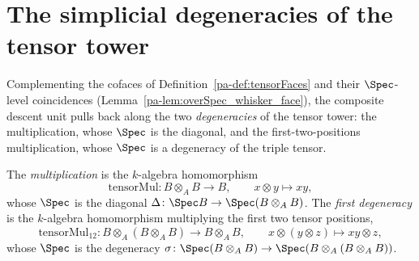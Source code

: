 \section{The simplicial degeneracies of the tensor tower}
\label{pa-sec:specDegeneracy}

Complementing the cofaces of Definition~\ref{pa-def:tensorFaces} and their \(\Spec\)-level
coincidences (Lemma~\ref{pa-lem:overSpec_whisker_face}), the composite descent unit pulls back
along the two \emph{degeneracies} of the tensor tower: the multiplication, whose \(\Spec\)
is the diagonal, and the first-two-positions multiplication, whose \(\Spec\) is a
degeneracy of the triple tensor.

\begin{definition}
  \label{pa-def:tensorMul}
  \leanok

  The \emph{multiplication} is the \(k\)-algebra homomorphism
  \[
    \mathrm{tensorMul} \colon B \otimes_A B \to B, \qquad x \otimes y \mapsto xy ,
  \]
  whose \(\Spec\) is the diagonal \(\Delta \colon \Spec B \to \Spec(B \otimes_A B)\). The
  \emph{first degeneracy} is the \(k\)-algebra homomorphism multiplying the first two tensor
  positions,
  \[
    \mathrm{tensorMul}_{12} \colon B \otimes_A (B \otimes_A B) \to B \otimes_A B, \qquad
    x \otimes (y \otimes z) \mapsto xy \otimes z ,
  \]
  whose \(\Spec\) is the degeneracy \(\sigma \colon \Spec(B \otimes_A B) \to
  \Spec(B \otimes_A (B \otimes_A B))\).
\end{definition}

